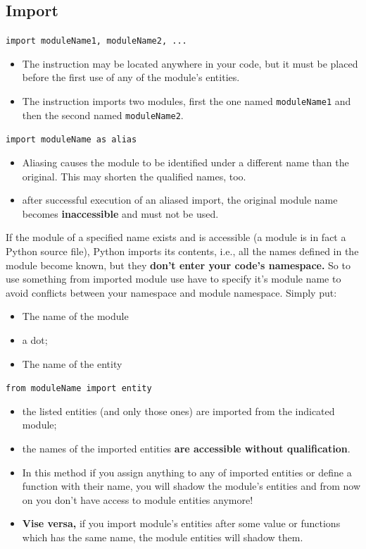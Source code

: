 \documentclass[11pt]{article}
\begin{document}
\subsection{Import}
\label{sec:orgb5dcd85}
\begin{description}
\item[{syntax}] \texttt{import moduleName1, moduleName2, ...}
\begin{itemize}
\item The instruction may be located anywhere in your code, but it must be
placed before the first use of any of the module’s entities.
\item The instruction imports two modules, first the one named \texttt{moduleName1} and
then the second named \texttt{moduleName2}.
\end{itemize}

\item[{syntax}] \texttt{import moduleName as alias}
\begin{itemize}
\item Aliasing causes the module to be identified under a different
name than the original. This may shorten the qualified names,
too.
\item after successful execution of an aliased import, the original
module name becomes \textbf{inaccessible} and must not be used.
\end{itemize}

\item If the module of a specified name exists and is accessible (a module
is in fact a Python source file), Python imports its contents, i.e.,
all the names defined in the module become known, but they \textbf{don’t
enter your code’s namespace.} So to use something from imported
module use have to specify it's module name to avoid conflicts
between your namespace and module namespace. Simply put:
\begin{itemize}
\item The name of the module
\item a dot;
\item The name of the entity
\end{itemize}

\item[{syntax}] \texttt{from moduleName import entity}
\begin{itemize}
\item the listed entities (and only those ones) are imported from the
indicated module;
\item the names of the imported entities \textbf{are accessible without
qualification}.
\item In this method if you assign anything to any of imported entities
or define a function with their name, you will shadow the module's
entities and from now on you don't have access to module entities
anymore!
\item \textbf{Vise versa,} if you import module's entities after some value or
functions which has the same name, the module entities will shadow
them.
\end{itemize}


\end{description}
\end{document}
